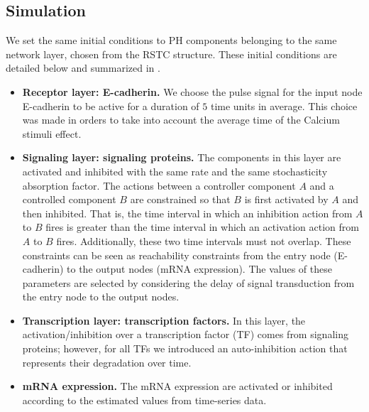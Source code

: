 \subsection{Simulation}

We set the same initial conditions to PH components belonging to the same network layer, chosen from the RSTC structure.
These initial conditions are detailed below and summarized in .
\begin{itemize}
 \item \textbf{Receptor layer: E-cadherin.} We choose the  pulse signal for the input node E-cadherin to be active for a duration of $5$ time units in average. This 
 choice was made in orders to take into account the average time of the Calcium stimuli effect.
 \item \textbf{Signaling layer: signaling proteins.} The components in this layer are activated and inhibited with the same rate and the same stochasticity absorption factor. 
The actions between a controller component $A$ and a controlled component $B$ are constrained so that 
$B$ is first activated by $A$ and then inhibited.  That is, 
the time interval in which an inhibition action from $A$ to $B$ fires is greater than 
the time interval in which an activation action from $A$ to $B$ fires.
Additionally, these two time intervals must not overlap.
These constraints can be seen as 
reachability constraints from the entry  node (E-cadherin) to the output nodes (mRNA expression). The values of these parameters are selected by considering the delay of signal transduction from the entry
 node to the output nodes.
 \item \textbf{Transcription layer: transcription factors.} In this layer, the activation/inhibition over a transcription factor (TF) comes from signaling proteins; however, 
for all TFs we introduced an auto-inhibition action that represents their degradation over time. 
 \item \textbf{mRNA expression.} The mRNA expression are activated or inhibited according to the estimated values from time-series data.
\end{itemize}


